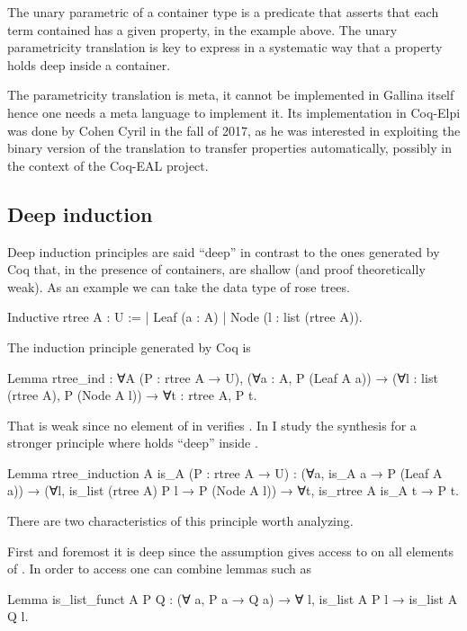 \documentclass[a4paper, 11pt]{book}
\begin{document}
The unary parametric of a container type is a predicate that
asserts that each term contained has a given property, 
in the example above. The unary parametricity translation is key to express in a
systematic way that a property holds deep inside a container.

The parametricity translation is meta, it cannot be implemented in Gallina
itself hence one needs a meta language to implement it. Its implementation
in Coq-Elpi was done by Cohen Cyril in the fall of 2017, as he was interested
in exploiting the binary version of the translation to transfer properties
automatically, possibly in the context of the Coq-EAL project.


\subsection{Deep induction}

Deep induction principles are said ``deep'' in contrast to the ones generated
by Coq that, in the presence of containers, are shallow (and proof theoretically
weak). As an example we can take the data type of rose trees.

\begin{coqcode}
Inductive rtree A : U :=
| Leaf (a : A)
| Node (l : list (rtree A)).
\end{coqcode}

The induction principle generated by Coq is

\begin{coqcode}
Lemma rtree_ind : ∀A (P : rtree A → U),
  (∀a : A, P (Leaf A a)) →
  (∀l : list (rtree A), P (Node A l)) →
  ∀t : rtree A, P t.
\end{coqcode}

That is weak since no element of  in 
verifies . In \cite{tassi:hal-01897468} I study the synthesis
for a stronger principle where  holds ``deep'' inside .

\begin{coqcode}
Lemma rtree_induction A is_A (P : rtree A → U) :
  (∀a, is_A a → P (Leaf A a)) →
  (∀l, is_list (rtree A) P l → P (Node A l)) →
     ∀t, is_rtree A is_A t → P t.
\end{coqcode}

There are two characteristics of this principle worth analyzing.

First and foremost it is deep since the assumption
 gives access to  on all
elements of .
In order to access  one can combine lemmas such as
\begin{coqcode}
Lemma is_list_funct A P Q : (∀ a, P a → Q a) → ∀ l, is_list A P l → is_list A Q l.
\end{coqcode}
\end{document}
